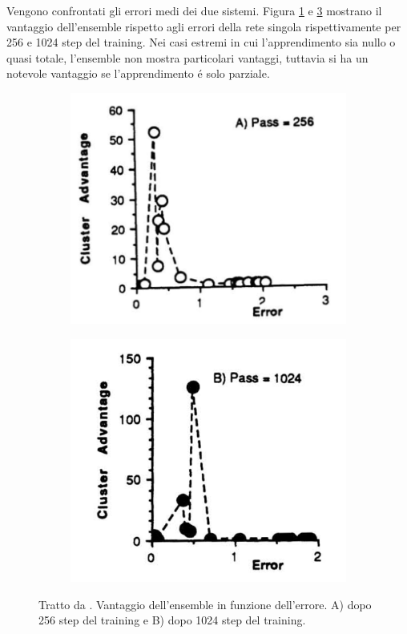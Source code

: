 \documentclass[a4paper,12pt]{report}
\begin{document}
 
 Vengono confrontati gli errori medi dei due sistemi. 
 Figura \ref{EnsembleAdvantageapng} e \ref{EnsembleAdvantagebpng} mostrano il vantaggio dell'ensemble rispetto agli errori della rete singola rispettivamente per 256 e 1024 step del training. 
 Nei casi estremi in cui l'apprendimento sia nullo o quasi totale, l'ensemble non mostra particolari vantaggi, tuttavia si ha un notevole vantaggio se l'apprendimento \'e solo parziale.
 
 \begin{figure}[h!]
  \centering
  \begin{subfigure}[b]{0.4\linewidth}
   \includegraphics[width=\linewidth]{ClusterErrora.png}
   \label{EnsembleAdvantageapng}
  \end{subfigure}
  \begin{subfigure}[b]{0.4\linewidth}
   \includegraphics[width=\linewidth]{ClusterErrorb.png}
   \label{EnsembleAdvantagebpng}
  \end{subfigure}
  \caption{Tratto da \cite{lincoln1990synergy}. Vantaggio dell'ensemble in funzione dell'errore. A) dopo 256 step del training e B) dopo 1024 step del training.}
 \end{figure}
 
\end{document}

